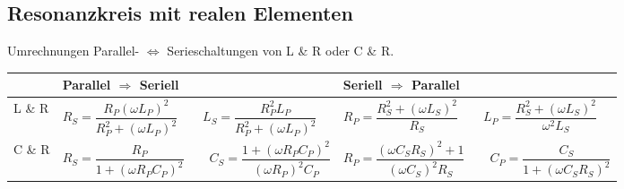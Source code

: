 \subsection{Resonanzkreis mit realen Elementen}
Umrechnungen Parallel- $\Longleftrightarrow$ Serieschaltungen von L \& R oder C \& R. \\

\renewcommand{\arraystretch}{1.1}
\begin{tabular}{| p{2cm} | p{8cm} | p{8cm} |}
	\hline
		& \textbf{Parallel $\Rightarrow$ Seriell}  
		& \textbf{Seriell $\Rightarrow$ Parallel} \\
	\hline
		L \& R
		& $ R_S = \dfrac{R_P (\omega L_P)^2}{R_P^2 + (\omega L_P)^2} \qquad 
			L_S = \dfrac{R_P^2 L_P}{R_P^2 + (\omega L_P)^2}  $
		& $ R_P = \dfrac{R_S^2 + (\omega L_S)^2}{R_S} \qquad 
			L_P = \dfrac{R_S^2 + (\omega L_S)^2}{\omega^2 L_S}   $ \\
	\hline	
		C \& R
		& $ R_S = \dfrac{R_P}{1 + (\omega R_P C_P)^2} \qquad 
			C_S = \dfrac{1 + (\omega R_P C_P)^2}{(\omega R_P)^2 C_P}$
		& $ R_P = \dfrac{(\omega C_S R_S)^2 + 1}{(\omega C_S)^2 R_S} \qquad
			C_P = \dfrac{C_S}{1 + (\omega C_S R_S)^2}$\\
	\hline
\end{tabular}
\renewcommand{\arraystretch}{1}
